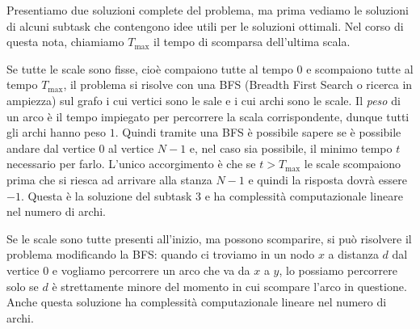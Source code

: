 \newpage
\setcounter{figure}{0}


\pagecolor{backcolor}

\newcommand{\inizio}{\ensuremath{\mathrm{inizio}}}
\newcommand{\fine}{\ensuremath{\mathrm{fine}}}

\Solution

Presentiamo due soluzioni complete del problema, ma prima vediamo le soluzioni di alcuni subtask che contengono idee utili per le soluzioni ottimali. Nel corso di questa nota, chiamiamo $T_{\max}$ il tempo di scomparsa dell'ultima scala. 

\ArchiFissi

Se tutte le scale sono fisse, cioè compaiono tutte al tempo $0$ e scompaiono tutte al tempo $T_{\max}$, il problema si risolve con una BFS (Breadth First Search o ricerca in ampiezza) sul grafo i cui vertici sono le sale e i cui archi sono le scale. Il \emph{peso} di un arco è il tempo impiegato per percorrere la scala corrispondente, dunque tutti gli archi hanno peso $1$. Quindi tramite una BFS è possibile sapere se è possibile andare dal vertice $0$ al vertice $N-1$ e, nel caso sia possibile, il minimo tempo $t$ necessario per farlo. L'unico accorgimento è che se $t > T_{\max}$ le scale scompaiono prima che si riesca ad arrivare alla stanza $N-1$ e quindi la risposta dovrà essere $-1$. Questa è la soluzione del subtask 3 e ha complessità computazionale lineare nel numero di archi.

\ScompaionoSolo

Se le scale sono tutte presenti all'inizio, ma possono scomparire, si può risolvere il problema modificando la BFS: quando ci troviamo in un nodo $x$ a distanza $d$ dal vertice $0$ e vogliamo percorrere un arco che va da $x$ a $y$, lo possiamo percorrere solo se $d$ è strettamente minore del momento in cui scompare l'arco in questione. Anche questa soluzione ha complessità computazionale lineare nel numero di archi.

